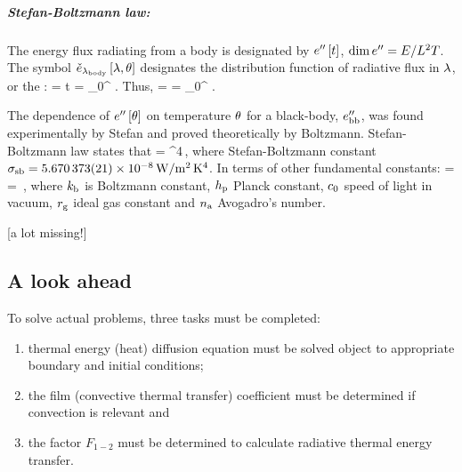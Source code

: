 \subparagraph{Stefan-Boltzmann law:}
The energy flux radiating from a body is designated by $\flux\then\vat t$, $\dim\flux\then = E/L^2T$. The symbol $\dbflux\vat{\wlen,\temp}$ designates the distribution function of radiative flux in $\wlen$, or the :
\beq
\dbflux\vat{\wlen,\temp} = \iod t \flux\then\vat{\wlen,\temp}\qquad{}\qquad
\flux\then\vat{\wlen,\temp}  = \int_{0}^{\wlen}\dbflux\vat{\wlen,\temp}\,\dx\wlen\,.
\eeq
Thus,
\beq
\flux\then\vat{\temp} = \flux\then\vat{\infty,\temp} 
                      = \int_{0}^{\infty}\dbflux\vat{\wlen,\temp}\,\dx\wlen\,.
\eeq

The dependence of $\flux\then\vat{\temp}$ on temperature $\temp$ for a black-body, $\bbflux$, was found experimentally by Stefan and proved theoretically by Boltzmann. Stefan-Boltzmann law states that
\beq
\bbflux\vat\temp = \kstef\temp^4\,,
\eeq
where Stefan-Boltzmann constant $\kstef = \SI{5.670373(21)e-8}{W/m^2.K^4}$. In terms of other fundamental constants:
\beq
\kstef = 
       = \,,
\eeq
where $\kboltz$ is Boltzmann constant, $\kplanck$ Planck constant, $\klight$ speed of light in vacuum, $\kgas$ ideal gas constant and $\kavog$ Avogadro's number.

[a lot missing!]


\subsection{A look ahead}
To solve actual problems, three tasks must be completed:
\begin{enumerate}
\item thermal energy (heat) diffusion equation must be solved object to appropriate boundary and initial conditions;
%
\item the film (convective thermal transfer) coefficient must be determined if convection is relevant and
\item the factor $F_{1-2}$ must be determined to calculate radiative thermal energy transfer.
\end{enumerate}
